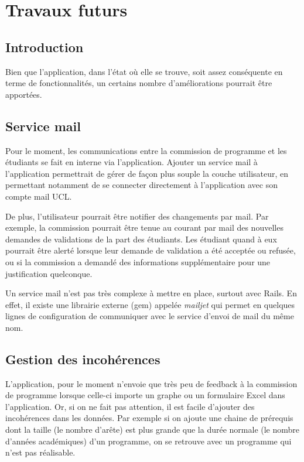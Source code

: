 \chapter{Travaux futurs}
\label{futur_work}
\section{Introduction}
Bien que l’application, dans l'état où elle se trouve, soit assez conséquente en terme de fonctionnalités, un certains nombre d'améliorations pourrait être apportées. 

\section{Service mail}
Pour le moment, les communications entre la commission de programme et les étudiants se fait en interne via l'application. Ajouter un service mail à l'application permettrait de gérer de façon plus souple la couche utilisateur, en permettant notamment de se connecter directement à l'application avec son compte mail UCL.

De plus, l'utilisateur pourrait être notifier des changements par mail. Par exemple, la commission pourrait être tenue au courant par mail des nouvelles demandes de validations de la part des étudiants. Les étudiant quand à eux pourrait être alerté lorsque leur demande de validation a été acceptée ou refusée, ou si la commission a demandé des informations supplémentaire pour une justification quelconque. 

Un service mail n'est pas très complexe à mettre en place, surtout avec Rails. En effet, il existe une librairie externe (gem) appelée \textit{mailjet} qui permet en quelques lignes de configuration de communiquer avec le service d'envoi de mail du même nom. 
\section{Gestion des incohérences}

L'application, pour le moment n'envoie que très peu de feedback à la commission de programme lorsque celle-ci importe un graphe ou un formulaire Excel dans l'application. Or, si on ne fait pas attention, il est facile d'ajouter des incohérences dans les données. Par exemple si on ajoute une chaine de prérequis dont la taille (le nombre d’arête) est plus grande que la durée normale (le nombre d'années académiques) d'un programme, on se retrouve avec un programme qui n'est pas réalisable.

